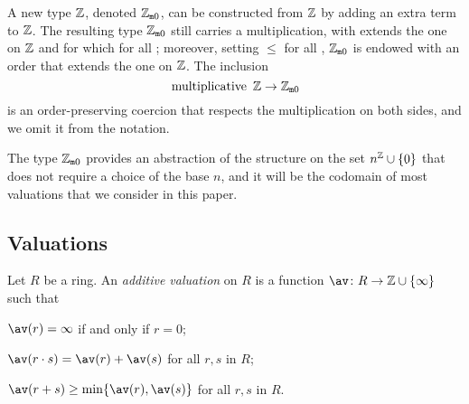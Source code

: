 \documentclass[sigplan,10pt,anonymous,review]{acmart}
\begin{document}
A new type  $\mathbb{Z}$\code{)}, denoted $\mathbb{Z}_{\mathtt{m}0}$, can be constructed from  $\mathbb{Z}$ by adding an extra term  to  $\mathbb{Z}$. The resulting type $\mathbb{Z}_{\mathtt{m}0}$ still carries a multiplication, with extends the one on  $\mathbb{Z}$ and for which  for all ; moreover, setting  $\le$  for all , $\mathbb{Z}_{\mathtt{m}0}$ is endowed with an order that extends the one on  $\mathbb{Z}$. The inclusion
\[
\text{\code{multiplicative} }\ZZ \rightarrow \wzmZZ
\]
is an order-preserving coercion that respects the multiplication on both sides, and we omit it from the notation.

The type $\mathbb{Z}_{\mathtt{m}0}$ provides an abstraction of the structure on the set $n^{\mathbb{Z}} \cup \{0\}$ that does not require a choice of the base $n$, and it will be the codomain of most valuations that we consider in this paper.

\subsection{Valuations}\label{subsection:valuations}
\begin{definition}\label{def:add_valuation}
Let $R$ be a ring. An \emph{additive valuation} on $R$ is a function $\av \colon R \to \ZZ \cup \{\infty\}$ such that
\begin{listDef}
	\item $\av(r) = \infty$ if and only if $r = 0$; \label{def_add_valuation:zero}
	\item $\av (r\cdot s) = \av(r) + \av(s)$ for all $r, s$ in $R$;\label{def_add_valuation:mul}
	\item $\av (r + s) \geq \min \{\av(r), \av(s)\}$ for all $r, s$ in $R$. \label{def_add_valuation:add}
\end{listDef}
\end{definition}
\end{document}
